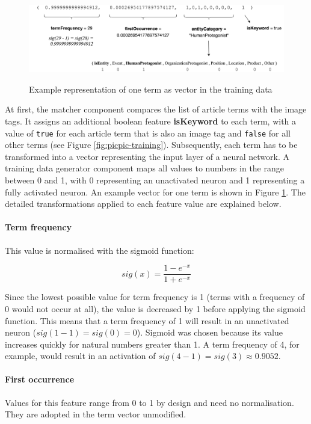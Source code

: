 \documentclass[11pt,a4paper,twoside]{article}
\begin{document}
\begin{figure}[h]
    \caption{Example representation of one term as vector in the training data}
    \centering
    \includegraphics[width=\columnwidth]{example-training-term.png}
    \label{fig:example-training-term}
\end{figure}

\noindent At first, the matcher component compares the list of article terms with the image tags. It assigns an additional boolean feature \textbf{isKeyword} to each term, with a value of \lstinline{true} for each article term that is also an image tag and \lstinline{false} for all other terms (see Figure \ref{fig:picpic-training}). Subsequently, each term has to be transformed into a vector representing the input layer of a neural network. A training data generator component maps all values to numbers in the range between 0 and 1, with 0 representing an unactivated neuron and 1 representing a fully activated neuron. An example vector for one term is shown in Figure \ref{fig:example-training-term}. The detailed transformations applied to each feature value are explained below.

\paragraph{Term frequency} This value is normalised with the sigmoid function:

\[
sig(x) = \frac{1 - e^{-x}}{1 + e^{-x}}
\]

\noindent Since the lowest possible value for term frequency is 1 (terms with a frequency of 0 would not occur at all), the value is decreased by 1 before applying the sigmoid function. This means that a term frequency of 1 will result in an unactivated neuron ($sig(1-1) = sig(0) = 0$). Sigmoid was chosen because its value increases quickly for natural numbers greater than 1. A term frequency of 4, for example, would result in an activation of $sig(4-1) = sig(3) \approx 0.9052$.

\paragraph{First occurrence} Values for this feature range from 0 to 1 by design and need no normalisation. They are adopted in the term vector unmodified.
\end{document}
